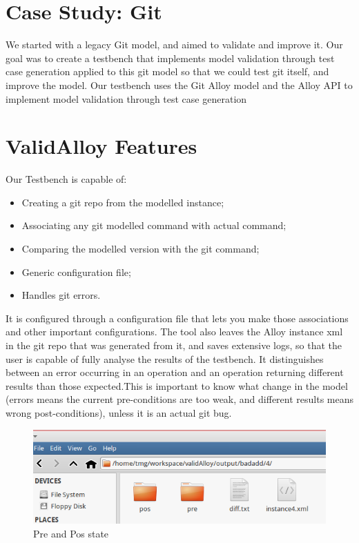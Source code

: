 

\section{Case Study: Git}
We started with a legacy Git model, and aimed to validate and improve it.
Our goal was to create a testbench that implements model validation through test case generation applied to this git model so that we could test git itself, and improve the model.
Our testbench uses the Git Alloy model and the Alloy API to implement model validation through test case generation



\section{ValidAlloy Features}
Our Testbench is capable of:
\begin{itemize}
\item Creating a git repo from the modelled instance;
\item Associating any git modelled command with actual command;
\item Comparing the modelled version with the git command;
\item Generic configuration file;
\item Handles git errors.
\end{itemize}


It is configured through a configuration file that lets you make those associations and other important configurations.
The tool also leaves the Alloy instance xml in the git repo that was generated from it, and saves extensive logs, so that the user is capable of fully analyse the results of the testbench.
It distinguishes between an error occurring in an operation and an operation returning different results than those expected.This is important to know what change in the model (errors means the current pre-conditions are too weak, and different results means wrong post-conditions), unless it is an actual git bug.

\begin{figure}[H]
\centering
\includegraphics[width=\textwidth]{images/INSIDE.png}
\caption{Pre and Pos state}
\end{figure}


